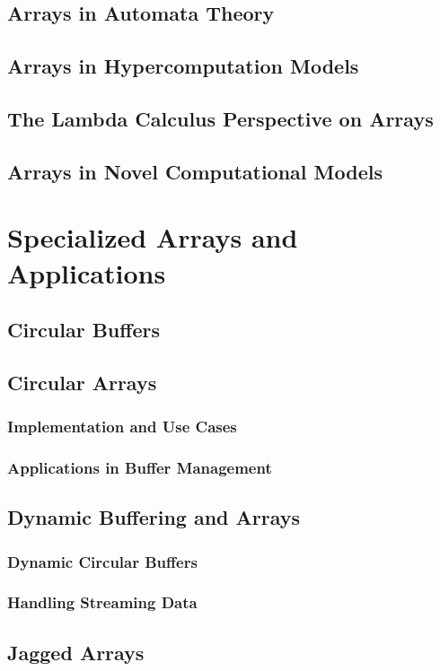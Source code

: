\documentclass[12pt, oneside]{book}
\begin{document}
\section{Arrays in Automata Theory}
\section{Arrays in Hypercomputation Models}
\section{The Lambda Calculus Perspective on Arrays}
\section{Arrays in Novel Computational Models}

\chapter{Specialized Arrays and Applications}
	\section{Circular Buffers}
	\section{Circular Arrays}
	\subsection{Implementation and Use Cases}
	\subsection{Applications in Buffer Management}
	
	\section{Dynamic Buffering and Arrays}
	\subsection{Dynamic Circular Buffers}
	\subsection{Handling Streaming Data}
	
	\section{Jagged Arrays}
\end{document}
